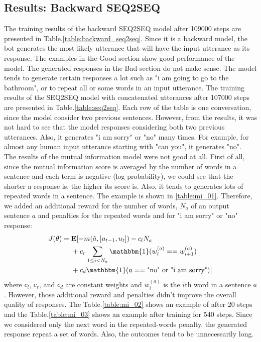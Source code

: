 \documentclass[letterpaper]{article}
\begin{document}
\subsection{Results: Backward SEQ2SEQ}
The training results of the backward SEQ2SEQ model after 109000 steps are presented in Table.\ref{table:backward_seq2seq}. Since it is a backward model, the bot generates the most likely utterance that will have the input utterance as its response. The examples in the Good section show good performance of the model. The generated responses in the Bad section do not make sense. The model tends to generate certain responses a lot such as "i am going to go to the bathroom", or to repeat all or some words in an input utterance. The training results of the SEQ2SEQ model with concatenated utterances after 107000 steps are presented in Table.\ref{table:seq2seq}. Each row of the table is one conversation, since the model consider two previous sentences. However, from the results, it was not hard to see that the model responses considering both two previous utterances. Also, it generates "i am sorry" or "no" many times. For example, for almost any human input utterance starting with "can you", it generates "no". \\
The results of the mutual information model were not good at all. First of all, since the mutual information score is averaged by the number of words in a sentence and each term is negative (log probability), we could see that the shorter a response is, the higher its score is. Also, it tends to generates lots of repeated words in a sentence. The example is shown in \ref{table:mi_01}. Therefore, we added an additional reward for the number of words, $N_a$ of an output sentence $a$ and penalties for the repeated words and for "i am sorry" or "no" response:
\begin{align}
    J(\theta) =&\; \mathbf{E} [-m(\hat{a},[u_{t-1},u_t])-c_l N_a \nonumber \\
     &\; + c_r \sum_{1\leq i < N_a} \mathbbm{1}(w_i^{(a)} == w_{i+1}^{(a)}) \nonumber \\ 
     &\; +c_d \mathbbm{1}(a == \text{"no" or "i am sorry"})]
\end{align}
where $c_l$, $c_r$, and $c_d$ are constant weights and $w_i^{(a)}$ is the $i$th word in a sentence $a$. However, those additional reward and penalties didn't improve the overall quality of responses. The Table.\ref{table:mi_02} shows an example of after 20 steps and the Table.\ref{table:mi_03} shows an example after training for 540 steps. Since we considered only the next word in the repeated-words penalty, the generated response repeat a set of words. Also, the outcomes tend to be unnecessarily long.
\end{document}
